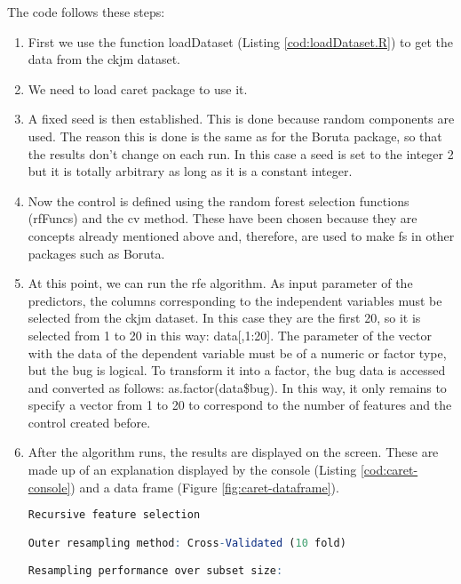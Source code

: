 The code follows these steps:

\begin{enumerate}
    \item First we use the function loadDataset (Listing \ref{cod:loadDataset.R}) to get the data from the ckjm dataset.
    
    \item We need to load caret package to use it.
    
    \item A fixed seed is then established. This is done because random components are used. The reason this is done is the same as for the Boruta package, so that the results don't change on each run. In this case a seed is set to the integer 2 but it is totally arbitrary as long as it is a constant integer.
    
    \item Now the control is defined using the random forest selection functions (rfFuncs) and the \acrfull{cv} method. These have been chosen because they are concepts already mentioned above and, therefore, are used to make \acrshort{fs} in other packages such as Boruta.
    
    \item At this point, we can run the \acrshort{rfe} algorithm. As input parameter of the predictors, the columns corresponding to the independent variables must be selected from the ckjm dataset. In this case they are the first 20, so it is selected from 1 to 20 in this way: data[,1:20]. The parameter of the vector with the data of the dependent variable must be of a numeric or factor type, but the bug is logical. To transform it into a factor, the bug data is accessed and converted as follows: as.factor(data\$bug). In this way, it only remains to specify a vector from 1 to 20 to correspond to the number of features and the control created before.
    
    \item After the algorithm runs, the results are displayed on the screen. These are made up of an explanation displayed by the console (Listing \ref{cod:caret-console}) and a data frame (Figure \ref{fig:caret-dataframe}).
    
\begin{codefloat}[H]
\begin{lstlisting}[language=R, style=console]
Recursive feature selection

Outer resampling method: Cross-Validated (10 fold) 

Resampling performance over subset size:



\end{lstlisting}
\end{codefloat}
\end{enumerate}
